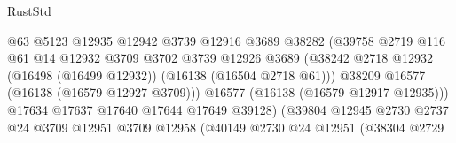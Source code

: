 \begin{lexlean}{RustStd}
\begin{coremodule}
                                            @63
                                            @5123
                                            @12935
                                            @12942
                                            @3739
                                            @12916
                                            @3689
                                            @38282
                                            (@39758
                                              @2719
                                              @116
                                              @61
                                              @14
                                              @12932
                                              @3709
                                              @3702
                                              @3739
                                              @12926
                                              @3689
                                              (@38242
                                                @2718
                                                @12932
                                                (@16498 (@16499 @12932))
                                                (@16138 (@16504 @2718 @61)))
                                              @38209
                                              @16577
                                              (@16138 (@16579 @12927 @3709)))
                                            @16577
                                            (@16138 (@16579 @12917 @12935)))
                                          @17634
                                          @17637
                                          @17640
                                          @17644
                                          @17649
                                          @39128)
                                        (@39804
                                          @12945
                                          @2730
                                          @2737
                                          @24
                                          @3709
                                          @12951
                                          @3709
                                          @12958
                                          (@40149
                                            @2730
                                            @24
                                            @12951
                                            (@38304
                                              @2729

\end{coremodule}
\end{lexlean}
